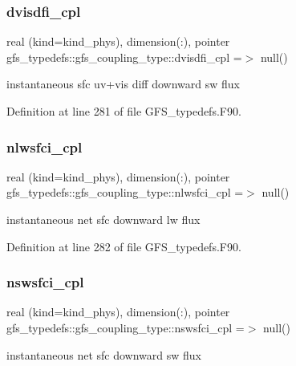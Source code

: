 \subsubsection{dvisdfi\+\_\+cpl}
{\footnotesize\ttfamily real (kind=kind\+\_\+phys), dimension(\+:), pointer gfs\+\_\+typedefs\+::gfs\+\_\+coupling\+\_\+type\+::dvisdfi\+\_\+cpl =$>$ null()}



instantaneous sfc uv+vis diff downward sw flux 



Definition at line 281 of file G\+F\+S\+\_\+typedefs.\+F90.

\mbox{\label{structgfs__typedefs_1_1gfs__coupling__type_a353900a338819c556110d683065cb143}} 
\subsubsection{nlwsfci\+\_\+cpl}
{\footnotesize\ttfamily real (kind=kind\+\_\+phys), dimension(\+:), pointer gfs\+\_\+typedefs\+::gfs\+\_\+coupling\+\_\+type\+::nlwsfci\+\_\+cpl =$>$ null()}



instantaneous net sfc downward lw flux 



Definition at line 282 of file G\+F\+S\+\_\+typedefs.\+F90.

\mbox{\label{structgfs__typedefs_1_1gfs__coupling__type_a050cc9d298c6e4902bd9bc01ecf59412}} 
\subsubsection{nswsfci\+\_\+cpl}
{\footnotesize\ttfamily real (kind=kind\+\_\+phys), dimension(\+:), pointer gfs\+\_\+typedefs\+::gfs\+\_\+coupling\+\_\+type\+::nswsfci\+\_\+cpl =$>$ null()}



instantaneous net sfc downward sw flux 



